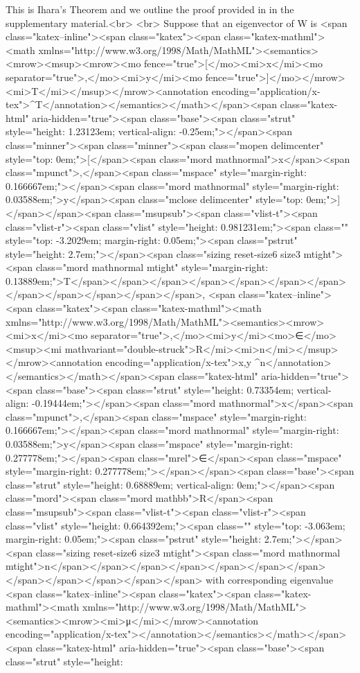 This is Ihara’s Theorem and we outline the proof provided in \cite{glover2020spectral} in the supplementary material.<br>
\newline<br>
Suppose that an eigenvector of W is <span class="katex--inline"><span class="katex"><span class="katex-mathml"><math xmlns="http://www.w3.org/1998/Math/MathML"><semantics><mrow><msup><mrow><mo fence="true">[</mo><mi>x</mi><mo separator="true">,</mo><mi>y</mi><mo fence="true">]</mo></mrow><mi>T</mi></msup></mrow><annotation encoding="application/x-tex">\left[ x , y \right]^T</annotation></semantics></math></span><span class="katex-html" aria-hidden="true"><span class="base"><span class="strut" style="height: 1.23123em; vertical-align: -0.25em;"></span><span class="minner"><span class="minner"><span class="mopen delimcenter" style="top: 0em;">[</span><span class="mord mathnormal">x</span><span class="mpunct">,</span><span class="mspace" style="margin-right: 0.166667em;"></span><span class="mord mathnormal" style="margin-right: 0.03588em;">y</span><span class="mclose delimcenter" style="top: 0em;">]</span></span><span class="msupsub"><span class="vlist-t"><span class="vlist-r"><span class="vlist" style="height: 0.981231em;"><span class="" style="top: -3.2029em; margin-right: 0.05em;"><span class="pstrut" style="height: 2.7em;"></span><span class="sizing reset-size6 size3 mtight"><span class="mord mathnormal mtight" style="margin-right: 0.13889em;">T</span></span></span></span></span></span></span></span></span></span></span></span>, <span class="katex--inline"><span class="katex"><span class="katex-mathml"><math xmlns="http://www.w3.org/1998/Math/MathML"><semantics><mrow><mi>x</mi><mo separator="true">,</mo><mi>y</mi><mo>∈</mo><msup><mi mathvariant="double-struck">R</mi><mi>n</mi></msup></mrow><annotation encoding="application/x-tex">x,y \in {}^n</annotation></semantics></math></span><span class="katex-html" aria-hidden="true"><span class="base"><span class="strut" style="height: 0.73354em; vertical-align: -0.19444em;"></span><span class="mord mathnormal">x</span><span class="mpunct">,</span><span class="mspace" style="margin-right: 0.166667em;"></span><span class="mord mathnormal" style="margin-right: 0.03588em;">y</span><span class="mspace" style="margin-right: 0.277778em;"></span><span class="mrel">∈</span><span class="mspace" style="margin-right: 0.277778em;"></span></span><span class="base"><span class="strut" style="height: 0.68889em; vertical-align: 0em;"></span><span class="mord"><span class="mord mathbb">R</span><span class="msupsub"><span class="vlist-t"><span class="vlist-r"><span class="vlist" style="height: 0.664392em;"><span class="" style="top: -3.063em; margin-right: 0.05em;"><span class="pstrut" style="height: 2.7em;"></span><span class="sizing reset-size6 size3 mtight"><span class="mord mathnormal mtight">n</span></span></span></span></span></span></span></span></span></span></span></span> with corresponding eigenvalue <span class="katex--inline"><span class="katex"><span class="katex-mathml"><math xmlns="http://www.w3.org/1998/Math/MathML"><semantics><mrow><mi>μ</mi></mrow><annotation encoding="application/x-tex">\mu</annotation></semantics></math></span><span class="katex-html" aria-hidden="true"><span class="base"><span class="strut" style="height: 